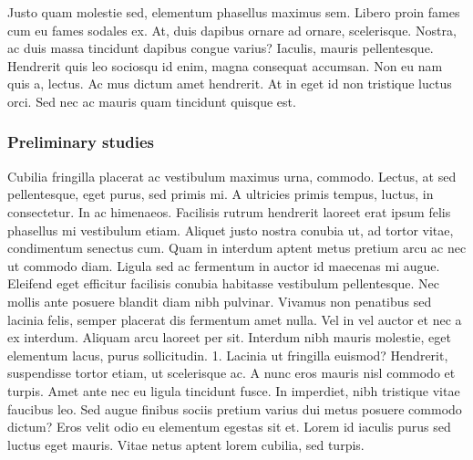 \documentclass[11pt,]{article}
\begin{document}
Justo quam molestie sed, elementum phasellus maximus sem. Libero proin
fames cum eu fames sodales ex. At, duis dapibus ornare ad ornare,
scelerisque. Nostra, ac duis massa tincidunt dapibus congue varius?
Iaculis, mauris pellentesque. Hendrerit quis leo sociosqu id enim, magna
consequat accumsan. Non eu nam quis a, lectus. Ac mus dictum amet
hendrerit. At in eget id non tristique luctus orci. Sed nec ac mauris
quam tincidunt quisque est.

\hypertarget{preliminary-studies}{%
\subsubsection{Preliminary studies}\label{preliminary-studies}}

Cubilia fringilla placerat ac vestibulum maximus urna, commodo. Lectus,
at sed pellentesque, eget purus, sed primis mi. A ultricies primis
tempus, luctus, in consectetur. In ac himenaeos. Facilisis rutrum
hendrerit laoreet erat ipsum felis phasellus mi vestibulum etiam.
Aliquet justo nostra conubia ut, ad tortor vitae, condimentum senectus
cum. Quam in interdum aptent metus pretium arcu ac nec ut commodo diam.
Ligula sed ac fermentum in auctor id maecenas mi augue. Eleifend eget
efficitur facilisis conubia habitasse vestibulum pellentesque. Nec
mollis ante posuere blandit diam nibh pulvinar. Vivamus non penatibus
sed lacinia felis, semper placerat dis fermentum amet nulla. Vel in vel
auctor et nec a ex interdum. Aliquam arcu laoreet per sit. Interdum nibh
mauris molestie, eget elementum lacus, purus sollicitudin. 1. Lacinia ut
fringilla euismod? Hendrerit, suspendisse tortor etiam, ut scelerisque
ac. A nunc eros mauris nisl commodo et turpis. Amet ante nec eu ligula
tincidunt fusce. In imperdiet, nibh tristique vitae faucibus leo. Sed
augue finibus sociis pretium varius dui metus posuere commodo dictum?
Eros velit odio eu elementum egestas sit et. Lorem id iaculis purus sed
luctus eget mauris. Vitae netus aptent lorem cubilia, sed turpis.
\end{document}
